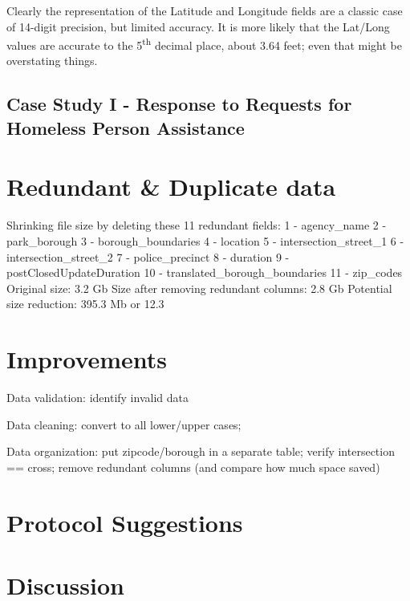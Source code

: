 \documentclass[12pt, titlepage]{article}
\begin{document}
Clearly the representation of the Latitude and Longitude fields are a classic case of 14-digit precision, 
but limited accuracy. It is more likely that the Lat/Long values are accurate to the 5\textsuperscript{th} decimal place, about 3.64 feet; even that might be
overstating things. 

\subsection{Case Study I - Response to Requests for Homeless Person Assistance}

\section{Redundant \& Duplicate data}
Shrinking file size by deleting these 11 redundant fields:
     1 - agency\_name 
     2 - park\_borough 
     3 - borough\_boundaries 
     4 - location 
     5 - intersection\_street\_1 
     6 - intersection\_street\_2 
     7 - police\_precinct 
     8 - duration 
     9 - postClosedUpdateDuration 
     10 - translated\_borough\_boundaries 
     11 - zip\_codes 
Original size: 3.2 Gb 
Size after removing redundant columns: 2.8 Gb 
Potential size reduction: 395.3 Mb or 12.3

\section{Improvements} \label{sec:improve}

Data validation: identify invalid data

Data cleaning: convert to all lower/upper cases;

Data organization: put zipcode/borough in a separate table; verify intersection
== cross; remove redundant columns (and compare how much space saved)

\section{Protocol Suggestions} \label{sec:protocol}

\section{Discussion} \label{sec:disc}




\end{document}
